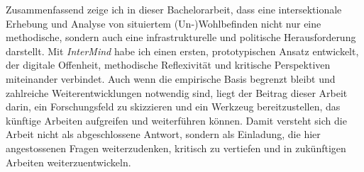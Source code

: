 Zusammenfassend zeige ich in dieser Bachelorarbeit, dass eine intersektionale Erhebung und Analyse von situiertem (Un\nobreakdash-)Wohlbefinden nicht nur eine methodische, sondern auch eine infrastrukturelle und politische Herausforderung darstellt. Mit \textit{InterMind} habe ich einen ersten, prototypischen Ansatz entwickelt, der digitale Offenheit, methodische Reflexivität und kritische Perspektiven miteinander verbindet. Auch wenn die empirische Basis begrenzt bleibt und zahlreiche Weiterentwicklungen notwendig sind, liegt der Beitrag dieser Arbeit darin, ein Forschungsfeld zu skizzieren und ein Werkzeug bereitzustellen, das künftige Arbeiten aufgreifen und weiterführen können. Damit versteht sich die Arbeit nicht als abgeschlossene Antwort, sondern als Einladung, die hier angestossenen Fragen weiterzudenken, kritisch zu vertiefen und in zukünftigen Arbeiten weiterzuentwickeln.

